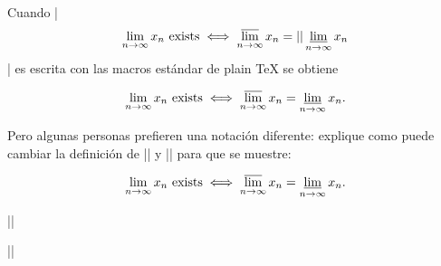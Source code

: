 

\bigskip

\enunciadoS Cuando |$$ \lim_{n \to\infty}x_n {\rm\ exists} \iff \limsup_{n\to\infty}x_n =| 

\noindent|\liminf_{n\to\infty}x_n$$| es escrita con las macros est\'andar de plain {\TeX}
se obtiene

$$ \lim_{n \to\infty}x_n {\rm\ exists} \iff \limsup_{n\to\infty}x_n = 
\liminf_{n\to\infty}x_n .$$

Pero algunas personas prefieren una notaci\'on diferente: explique como puede cambiar
la definici\'on de |\limsup| y |\lininf| para que se muestre:
\def\limsup{\mathop{\overline {\rm lim}}}
\def\liminf{\mathop{\underline {\rm lim}}}

$$ \lim_{n \to\infty}x_n {\rm\ exists} \iff \limsup_{n\to\infty}x_n = 
\liminf_{n\to\infty}x_n .$$

\respuestaS

|\def\limsup{\mathop{\overline {\rm lim}}}|

|\def\liminf{\mathop{\underline {\rm lim}}}|

\bye

